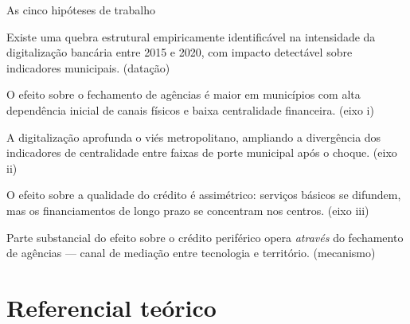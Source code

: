 \documentclass[aspectratio=169,10pt]{beamer}
\newcommand{\dest}[1]{\textcolor{cedlaranja}{\textbf{#1}}}
\begin{document}
\begin{frame}{As cinco hipóteses de trabalho}
  \small
  \begin{description}[H5]\setlength{\itemsep}{0.7em}
    \item[\dest{H1}] Existe uma quebra estrutural empiricamente identificável na
      intensidade da digitalização bancária entre 2015 e 2020, com impacto
      detectável sobre indicadores municipais. \hfill{\scriptsize\color{cedcinza}(datação)}
    \item[\dest{H2}] O efeito sobre o fechamento de agências é maior em municípios
      com alta dependência inicial de canais físicos e baixa centralidade
      financeira. \hfill{\scriptsize\color{cedcinza}(eixo i)}
    \item[\dest{H3}] A digitalização aprofunda o viés metropolitano, ampliando a
      divergência dos indicadores de centralidade entre faixas de porte municipal
      após o choque. \hfill{\scriptsize\color{cedcinza}(eixo ii)}
    \item[\dest{H4}] O efeito sobre a qualidade do crédito é assimétrico: serviços
      básicos se difundem, mas os financiamentos de longo prazo se concentram nos
      centros. \hfill{\scriptsize\color{cedcinza}(eixo iii)}
    \item[\dest{H5}] Parte substancial do efeito sobre o crédito periférico opera
      \emph{através} do fechamento de agências --- canal de mediação entre
      tecnologia e território. \hfill{\scriptsize\color{cedcinza}(mecanismo)}
  \end{description}
\end{frame}

\section{Referencial teórico}
\end{document}
